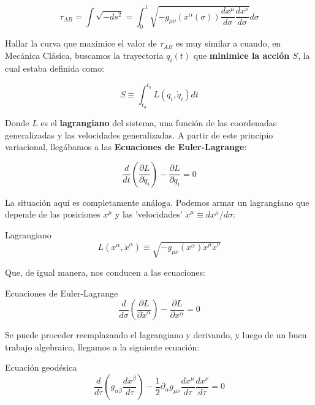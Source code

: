 \begin{equation}
    \tau_{AB}=\int \sqrt{-ds^2}=\int_0^1\sqrt{-g_{\mu\nu}(x^{\alpha}(\sigma))\frac{dx^\mu}{d\sigma}\frac{dx^\nu}{d\sigma}}d\sigma
\end{equation}

Hallar la curva que maximice el valor de $\tau_{AB}$ es muy similar a cuando, en Mecánica Clásica, buscamos la trayectoria $q_i(t)$ que \textbf{minimice la acción $S$}, la cual estaba definida como:

$$S\equiv \int_{t_a}^{t_b}L(q_i,\Dot{q}_i)dt$$

Donde $L$ es el \textbf{lagrangiano} del sistema, una función de las coordenadas generalizadas y las velocidades generalizadas. A partir de este principio variacional, llegábamos a las \textbf{Ecuaciones de Euler-Lagrange}:

\begin{equation}
    \frac{d }{dt}\left(\frac{\partial L}{\partial \dot{q}_i}\right)-\frac{\partial L}{\partial q_i}=0
\end{equation}

La situación aquí es completamente análoga. Podemos armar un lagrangiano que depende de las posiciones $x^{\mu}$ y las 'velocidades' $\dot{x}^\mu \equiv d x^\mu / d\sigma$:

\begin{remarkbox}{Lagrangiano}
\begin{equation}
    L(x^{\alpha},\dot{x}^{\alpha})\equiv\sqrt{-g_{\mu\nu}(x^{\alpha})\dot{x}^{\mu}\dot{x}^{\nu}}
\end{equation}
\end{remarkbox}

Que, de igual manera, nos conducen a las ecuaciones:

\begin{remarkbox}{Ecuaciones de Euler-Lagrange}
\begin{equation}
    \frac{d }{d\sigma}\left(\frac{\partial L}{\partial \dot{x}^{\alpha}}\right)-\frac{\partial L}{\partial x^{\alpha}}=0
\end{equation}
\end{remarkbox}

Se puede proceder reemplazando el lagrangiano y derivando, y luego de un buen trabajo algebraico, llegamos a la siguiente ecuación:

\begin{remarkbox}{Ecuación geodésica}
\begin{equation}
\frac{d}{d\tau}\left(g_{\alpha\beta}\frac{dx^{\beta}}{d\tau}\right)-\frac{1}{2}\partial_\alpha g_{\mu\nu}\frac{dx^{\mu}}{d\tau}\frac{dx^{\nu}}{d\tau}=0
\end{equation}
\end{remarkbox}


